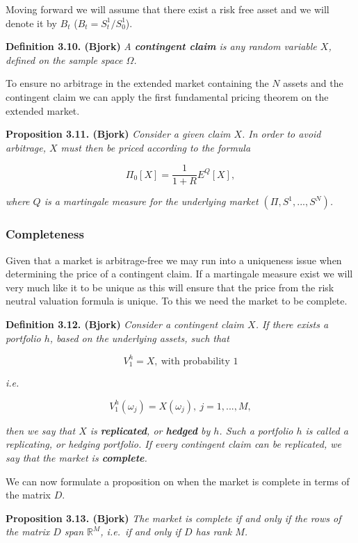 \documentclass[
]{book}
\begin{document}
Moving forward we will assume that there exist a risk free asset and we will denote it by \(B_t\) (\(B_t=S^1_t/S^1_0\)).

\textbf{Definition 3.10. (Bjork)} \emph{A \textbf{contingent claim} is any random variable \(X\), defined on the sample space \(\Omega\).}

To ensure no arbitrage in the extended market containing the \(N\) assets and the contingent claim we can apply the first fundamental pricing theorem on the extended market.

\textbf{Proposition 3.11. (Bjork)} \emph{Consider a given claim \(X\). In order to avoid arbitrage, \(X\) must then be priced according to the formula}

\[
\Pi_0[X]=\frac{1}{1+R}E^Q[X],\tag{3.10}
\]

\emph{where \(Q\) is a martingale measure for the underlying market \((\Pi,S^1,...,S^N)\).}

\hypertarget{completeness}{%
\subsubsection{Completeness}\label{completeness}}

Given that a market is arbitrage-free we may run into a uniqueness issue when determining the price of a contingent claim. If a martingale measure exist we will very much like it to be unique as this will ensure that the price from the risk neutral valuation formula is unique. To this we need the market to be complete.

\textbf{Definition 3.12. (Bjork)} \emph{Consider a contingent claim \(X\). If there exists a portfolio \(h\), based on the underlying assets, such that}

\[
V_1^h=X,\ \text{with probability 1}\tag{3.11}
\]

\emph{i.e.}

\[
V_1^h(\omega_j)=X(\omega_j),\ j=1,...,M,\tag{3.12}
\]

\emph{then we say that \(X\) is \textbf{replicated}, or \textbf{hedged} by \(h\). Such a portfolio \(h\) is called a replicating, or hedging portfolio. If every contingent claim can be replicated, we say that the market is \textbf{complete}.}

We can now formulate a proposition on when the market is complete in terms of the matrix \(D\).

\textbf{Proposition 3.13. (Bjork)} \emph{The market is complete if and only if the rows of the matrix \(D\) span \(\mathbb{R}^M\), i.e.~if and only if \(D\) has rank \(M\).}
\end{document}

